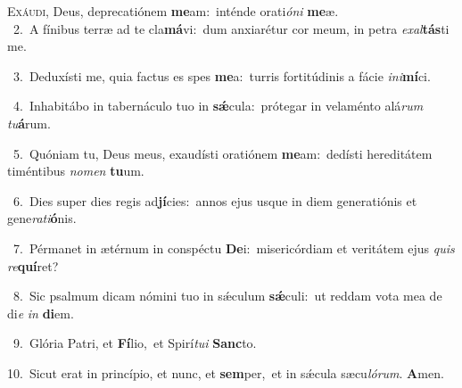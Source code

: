 \lettrine{\initial\textcolor{\initialcolor}{E}}{xáudi,} Deus, deprecatiónem \textbf{me}\-am:~\star inténde orati\-\textit{ó}\-\textit{ni} \textbf{me}\-æ.\\
{\numbfont\textcolor{\numbcolor}{~2.}}~A fínibus terræ ad te cla\-\textbf{má}\-vi:~\star dum anxiarétur cor meum, in petra \textit{ex}\-\textit{al}\textbf{tás}ti me.\par
{\numbfont\textcolor{\numbcolor}{~3.}}~Deduxísti me, quia factus es spes \textbf{me}\-a:~\star turris fortitúdinis a fácie \textit{in}\-\textit{i}\textbf{mí}ci.\par
{\numbfont\textcolor{\numbcolor}{~4.}}~Inhabitábo in tabernáculo tuo in \textbf{sǽ}\-cula:~\star prótegar in velaménto alá\textit{rum} \textit{tu}\-\textbf{á}rum.\par
{\numbfont\textcolor{\numbcolor}{~5.}}~Quóniam tu, Deus meus, exaudísti oratiónem \textbf{me}\-am:~\star dedísti hereditátem timéntibus \textit{no}\-\textit{men} \textbf{tu}\-um.\par
{\numbfont\textcolor{\numbcolor}{~6.}}~Dies super dies regis ad\-\textbf{jí}\-cies:~\star annos ejus usque in diem generatiónis et gene\-\textit{ra}\-\textit{ti}\textbf{ó}nis.\par
{\numbfont\textcolor{\numbcolor}{~7.}}~Pérmanet in ætérnum in conspéctu \textbf{De}\-i:~\star misericórdiam et veritátem ejus \textit{quis} \textit{re}\-\textbf{quí}ret?\par
{\numbfont\textcolor{\numbcolor}{~8.}}~Sic psalmum dicam nómini tuo in sǽculum \textbf{sǽ}\-culi:~\star ut reddam vota mea de di\textit{e} \textit{in} \textbf{di}\-em.\par
{\numbfont\textcolor{\numbcolor}{~9.}}~Glória Patri, et \textbf{Fí}\-lio,~\star et Spirí\-\textit{tu}\-\textit{i} \textbf{Sanc}\-to.\par
{\numbfont\textcolor{\numbcolor}{10.}}~Sicut erat in princípio, et nunc, et \textbf{sem}\-per,~\star et in sǽcula sæcu\-\textit{ló}\-\textit{rum}. \textbf{A}\-men.\par
